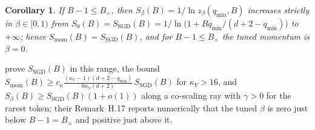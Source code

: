 \documentclass[11pt]{article}
\newtheorem{corollary}[theorem]{Corollary}
\begin{document}
\begin{corollary}\label{cor:belowbx}
If $B-1\le B_\times$, then $S_\beta(B)=1/\ln z_\beta(q_{\min},B)$ increases strictly in $\beta\in[0,1)$ from $S_0(B)=S_{\mathrm{SGD}}(B)=1/\ln\big(1+Bq_{\min}/(d+2-q_{\min})\big)$ to $+\infty$; hence $S_{\mathrm{mom}}(B)=S_{\mathrm{SGD}}(B)$, and for $B-1\le B_\times$ the tuned momentum is $\beta=0$.
\end{corollary}

\citet[Proposition~H.16(i)]{everett2026sparse} prove $S_{\mathrm{SGD}}(B)$ in this range, the bound $S_{\mathrm{mom}}(B)\ge c_\kappa\frac{(\kappa_V-1)(d+2-q_{\min})}{8\kappa_V(d+2)}\,S_{\mathrm{SGD}}(B)$ for $\kappa_V>16$, and $S_\beta(B)\ge S_{\mathrm{SGD}}(B)(1+o(1))$ along a co-scaling ray with $\gamma>0$ for the rarest token; their Remark~H.17 reports numerically that the tuned $\beta$ is zero just below $B-1=B_\times$ and positive just above it.
\end{document}
